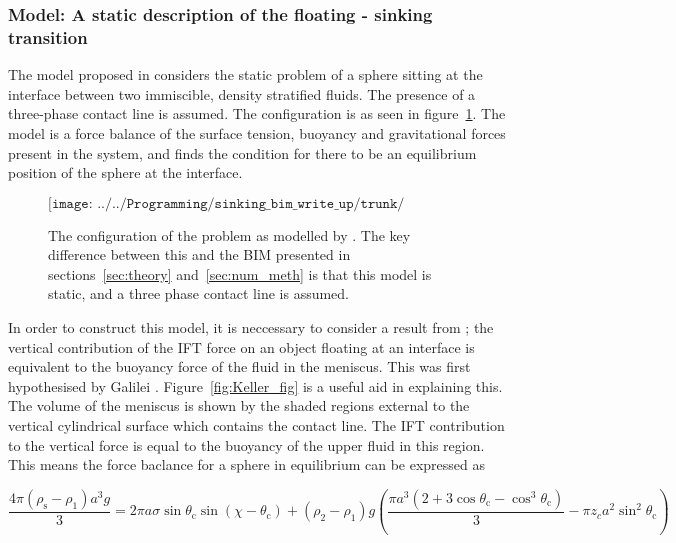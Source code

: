{\subsubsection{\citet{Vella06} Model: A static description of the floating - sinking transition}
\label{subsubsec:Vella_model}

The model proposed in \citet{Vella06} considers the static problem of a sphere sitting at the interface between two immiscible, density stratified fluids. The presence of a three-phase contact line is assumed. The configuration is as seen in figure~\ref{fig:Vella_config}. The model is a force balance of the surface tension, buoyancy and gravitational forces present in the system, and finds the condition for there to be an equilibrium position of the sphere at the interface. 

  \begin{figure}
    $$\texttt{[image: ../../Programming/sinking\_bim\_write\_up/trunk/physical\_formulation.eps]}$$
    \caption{The configuration of the problem as modelled by \citet{Vella06}. The key difference between this and the BIM presented in sections~\ref{sec:theory} and~\ref{sec:num_meth} is that this model is static, and a three phase contact line is assumed. \label{fig:Vella_config}}
  \end{figure}

In order to construct this model, it is neccessary to consider a result from \citet{Keller98}; the vertical contribution of the IFT force on an object floating at an interface is equivalent to the buoyancy force of the fluid in the meniscus. This was first hypothesised by Galilei \citep{Galilei1663, Vella(2)07}. Figure~\ref{fig:Keller_fig} is a useful aid in explaining this. The volume of the meniscus is shown by the shaded regions external to the vertical cylindrical surface which contains the contact line. The IFT contribution to the vertical force is equal to the buoyancy of the upper fluid in this region. This means the force baclance for a sphere in equilibrium can be expressed as

\begin{equation}
\label{equ:Vella_force}
\frac{4 \pi (\rho_{\text{s}} - \rho_{1}) a^{3} g}{3} = 2 \pi a \sigma \sin \theta_{\text{c}} \sin (\chi - \theta_{\text{c}}) + (\rho_{2} - \rho_{1}) g \left(\frac{\pi a^{3} (2 + 3 \cos \theta_{\text{c}} - \cos^{3} \theta_{\text{c}})}{3} - \pi z_{c} a^{2} \sin^{2} \theta_{\text{c}} \right)
\end{equation}

}
